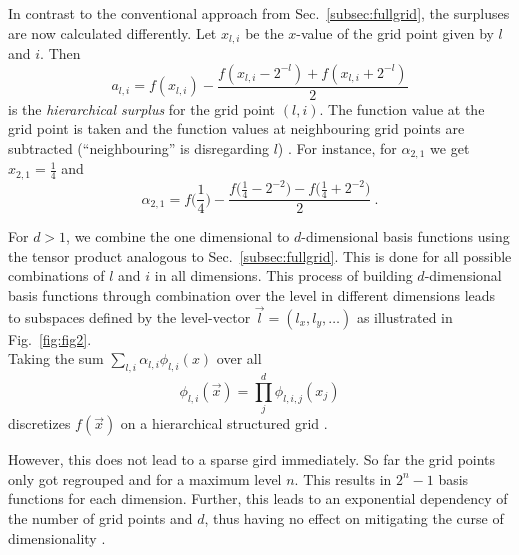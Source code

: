 In contrast to the conventional approach from
Sec.~\ref{subsec:fullgrid}, the surpluses are now calculated
differently.
Let $x_{l,i}$ be the $x$-value of the grid point given by $l$ and $i$. Then
$$a_{l,i} = f(x_{l,i}) - \frac{f(x_{l,i} - 2^{-l}) + f(x_{l,i} + 2^{-l})}{2}$$
is the \emph{hierarchical surplus} for the grid point $(l,i)$. The function
value at the grid point is taken and the function values
at neighbouring grid points are subtracted (``neighbouring''
is disregarding $l$) \cite{artbunlong}. 
For instance, for $\alpha_{2,1}$ we get $x_{2,1} =
\frac{1}{4}$ and
$$\alpha_{2,1} = f\Big(\frac{1}{4}\Big) - \frac{f\Big(\frac{1}{4} - 2^{-2}\Big) - f\Big(\frac{1}{4} + 2^{-2}\Big)}{2} \ .$$
\par
For $d > 1$, we combine the one dimensional
to $d$-dimensional basis functions using the tensor product
analogous to Sec.~\ref{subsec:fullgrid}. This is done for all possible combinations
of $l$ and $i$ in all dimensions.
This process of building $d$-dimensional basis functions
through combination over the level in different dimensions leads to
subspaces defined by the level-vector $\vec{l} = (l_x, l_y, \dots)$
as illustrated in Fig.~\ref{fig:fig2}. \\
Taking the sum $\sum_{l,i} \alpha_{l,i}\phi_{l,i}(x)$ over all
$$\phi_{l,i}(\vec{x}) = \prod_j^d{\phi_{l,i,j}(x_j)}$$
discretizes $f(\vec{x})$ on a hierarchical structured grid \cite{disspfl}.
\par
However, this does not lead to a sparse gird immediately. So far the
grid points only got regrouped and for a maximum level $n$. This
results in $2^{n} - 1$ basis functions for each dimension.
Further, this leads to an exponential dependency of the number of grid points
and $d$, thus having no effect on mitigating the curse of dimensionality
\cite{disspfl}.



